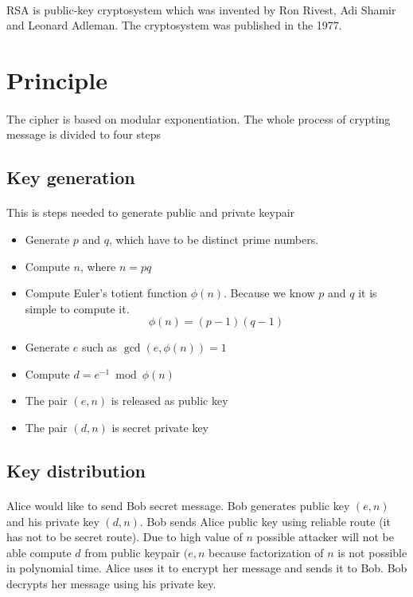 \documentclass[thesis=B,english]{FITthesis}[2012/10/20]
\begin{document}
{\paragraph*{}
{RSA is public-key cryptosystem which was invented by Ron Rivest, Adi Shamir and Leonard Adleman. The cryptosystem was published in the 1977.}


\section{Principle}
\paragraph*{}
{The cipher is based on modular exponentiation. The whole process of crypting message is divided to four steps}

\subsection{Key generation}
\paragraph*{}
{This is steps needed to generate public and private keypair}
\begin{itemize}
 \item Generate \(p\) and \(q\), which have to be distinct prime numbers.
 \item Compute \(n\), where \(n = p  q\)
 \item Compute Euler's totient function \(\phi(n)\). Because we know \(p\) and \(q\) it is simple to compute it. \[\phi(n) = (p - 1)(q - 1)\]
 \item Generate \(e\) such as \(\gcd(e,\phi(n)) = 1\) 
 \item Compute \(d = e^{-1}\bmod{\phi(n)} \)
 \item The pair \((e,n)\) is released as public key
 \item The pair \((d,n)\) is secret private key
\end{itemize}

\subsection{Key distribution}
\paragraph*{}
{Alice would like to send Bob secret message. Bob generates public key \((e,n)\) and his private key \((d,n)\). Bob sends Alice public key using reliable route (it has not to be secret route).
Due to high value of \(n\) possible attacker will not be able compute \(d\) from public keypair \((e,n\) because factorization of \(n\) is not possible in polynomial time.
Alice uses it to encrypt her message and sends it to Bob. Bob decrypts her message using his private key.}

}
\end{document}
